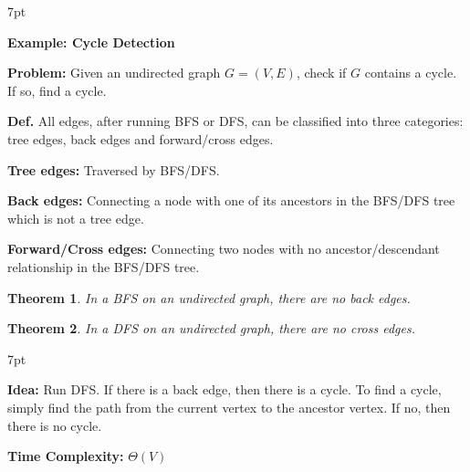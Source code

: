\documentclass[10pt]{article}
\newtheorem*{theorem}{Theorem}
\newenvironment{formal}[2]{%
	\def\FrameCommand{%
		\hspace{1pt}%
		{\color{#1}\vrule width 2pt}%
		{\color{#2}\vrule width 4pt}%
		\colorbox{#2}%
	}%
	\MakeFramed{\advance\hsize-\width\FrameRestore}%
	\noindent\hspace{-4.55pt}%
	\begin{adjustwidth}{}{7pt}%
		\vspace{2pt}\vspace{2pt}%
	}
	{%
		\vspace{2pt}\end{adjustwidth}\endMakeFramed%
}
\begin{document}
\begin{formal}{Brown}{brownshade}
	
	\textbf{Example: Cycle Detection}

	\textbf{Problem:} Given an undirected graph $G = (V, E)$, check if $G$ contains a cycle. If so, find a cycle.

	\textbf{Def.} All edges, after running BFS or DFS, can be classified into three categories: tree edges, back edges and forward/cross edges.

	\textbf{Tree edges:} Traversed by BFS/DFS.

	\textbf{Back edges:} Connecting a node with one of its ancestors in the BFS/DFS tree which is not a tree edge.

	\textbf{Forward/Cross edges:} Connecting two nodes with no ancestor/descendant relationship in the BFS/DFS tree.

\end{formal}

\begin{theorem}
	In a BFS on an undirected graph, there are no back edges.
\end{theorem}

\begin{theorem}
	In a DFS on an undirected graph, there are no cross edges.
\end{theorem}

\begin{formal}{Brown}{brownshade}

	\textbf{Idea:} Run DFS. If there is a back edge, then there is a cycle. To find a cycle, simply find the path from the current vertex to the ancestor vertex. If no, then there is no cycle.

	\noindent \textbf{Time Complexity:} $\Theta(V)$

\end{formal}
\end{document}
